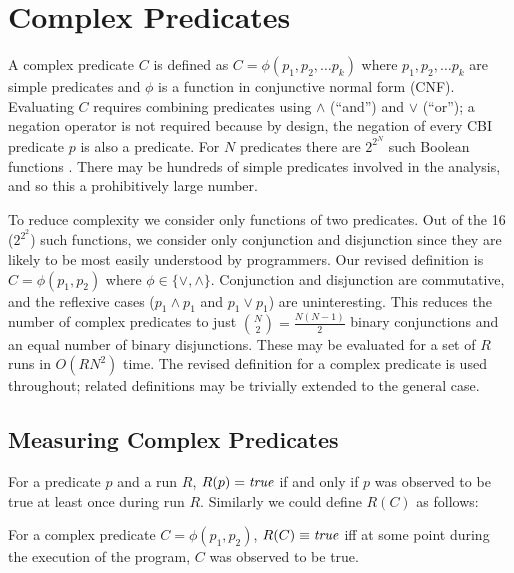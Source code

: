 
\section{Complex Predicates}
\label{sec-complex-preds}
A complex predicate $C$ is defined as $C = \phi(p_1, p_2, \ldots p_k)$ where 
$p_1, p_2, \ldots p_k$ are simple predicates and $\phi$ is a function in 
conjunctive normal form (CNF).  Evaluating $C$ requires combining predicates 
using $\wedge$ (``and'') and $\vee$ (``or''); a negation operator is not required 
because by design, the negation of every CBI predicate $p$ is also a predicate.  
For $N$ predicates there are $2^{2^N}$ such Boolean functions 
\cite{MathWorld:BoolFuncs}.  There may be hundreds of simple predicates involved 
in the analysis, and so this a prohibitively large number.

To reduce complexity we consider only functions of two predicates.  Out of the
16 ($2^{2^2}$) such functions, we consider only conjunction and disjunction since
they are likely to be most easily understood by programmers.  Our revised
definition is $C = \phi(p_1, p_2)$ where $\phi \in \{\vee, \wedge\}$.  Conjunction
and disjunction are commutative, and the reflexive cases ($p_1 \wedge p_1$ and 
$p_1 \vee p_1$) are uninteresting.  This reduces the number of complex predicates
to just ${N \choose 2} = \frac{N (N-1)}{2}$ binary conjunctions and an equal number 
of binary disjunctions.  These may be evaluated for a set of $R$ runs in $O(R N^2)$ 
time.  The revised definition for a complex predicate is used throughout; related
definitions may be trivially extended to the general case.

\subsection{Measuring Complex Predicates}
\label{sec-measuring}

For a predicate $p$ and a run $R$, $R(p) = \mathit{true}$ if and only if $p$ was observed to be true at least once during run $R$.  Similarly we could define $R(C)$ as follows:
\begin{defn}
\label{dfn1}
For a complex predicate $C = \phi(p_1, p_2)$, $R(C) \equiv \mathit{true}$ iff at some point during the execution of the program, $C$ was observed to be true.
\end{defn}

